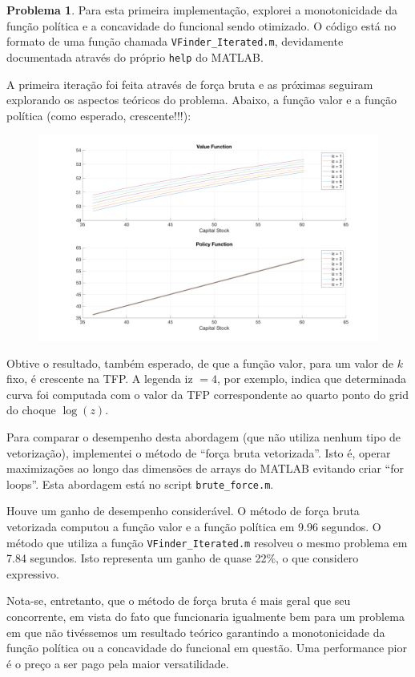 \documentclass[11pt]{article}
\theoremstyle{definition}
\theoremstyle{definition}
\newtheorem{problema}{Problema}
\theoremstyle{solution}
\begin{document}
\begin{problema}
	Para esta primeira implementação, explorei a monotonicidade da função política e a concavidade do funcional sendo otimizado. O código está no formato de uma função chamada \texttt{VFinder\_Iterated.m}, devidamente documentada através do próprio \texttt{help} do MATLAB.
	
	A primeira iteração foi feita através de força bruta e as próximas seguiram explorando os aspectos teóricos do problema. Abaixo, a função valor e a função política (como esperado, crescente!!!):
	\begin{figure}[htb!]
		\centering
		\includegraphics[scale = 0.22]{problem3_V_vs_G}
	\end{figure}
	
	Obtive o resultado, também esperado, de que a função valor, para um valor de $k$ fixo, é crescente na TFP. A legenda iz $= 4$, por exemplo, indica que determinada curva foi computada com o valor da TFP correspondente ao quarto ponto do grid do choque $\log (z)$.
	
	Para comparar o desempenho desta abordagem (que não utiliza nenhum tipo de vetorização), implementei o método de ``força bruta vetorizada''. Isto é, operar maximizações ao longo das dimensões de arrays do MATLAB evitando criar ``for loops''. Esta abordagem está no script \texttt{brute\_force.m}.
	
	Houve um ganho de desempenho considerável. O método de força bruta vetorizada computou a função valor e a função política em 9.96 segundos. O método que utiliza a função \texttt{VFinder\_Iterated.m} resolveu o mesmo problema em 7.84 segundos. Isto representa um ganho de quase 22\%, o que considero expressivo. 
	
	Nota-se, entretanto, que o método de força bruta é mais geral que seu concorrente, em vista do fato que funcionaria igualmente bem para um problema em que não tivéssemos um resultado teórico garantindo a monotonicidade da função política ou a concavidade do funcional em questão. Uma performance pior é o preço a ser pago pela maior versatilidade.
	\end{problema}
	
\end{document}
